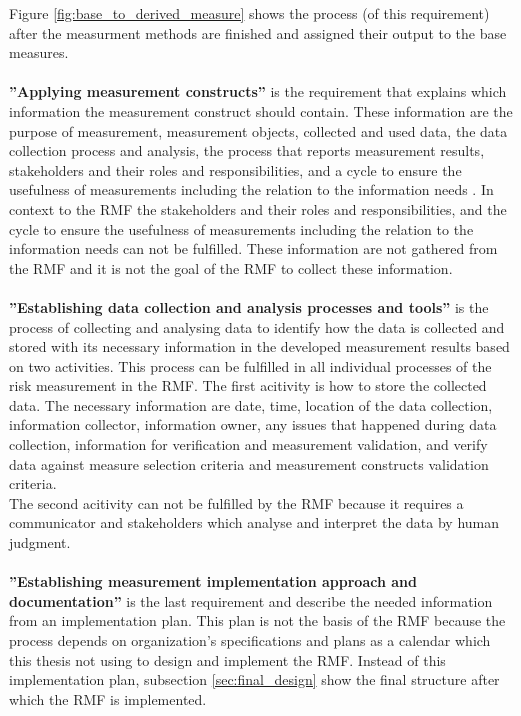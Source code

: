 Figure \ref{fig:base_to_derived_measure} shows the process (of this requirement) after the measurment methods are finished and assigned their output to the base measures.\\ \\

\textbf{''Applying measurement constructs''} is the requirement that explains which information the measurement construct should contain. These information are the purpose of measurement, measurement objects, collected and used data, the data collection process and analysis, the process that reports measurement results, stakeholders and their roles and responsibilities, and a cycle to ensure the usefulness of measurements including the relation to the information needs \cite{ISO_27004_2009}. In context to the RMF the stakeholders and their roles and responsibilities, and the cycle to ensure the usefulness of measurements including the relation to the information needs can not be fulfilled. These information are not gathered from the RMF and it is not the goal of the RMF to collect these information. \\ \\

\textbf{''Establishing data collection and analysis processes and tools''} is the process of collecting and analysing data to identify how the data is collected and stored with its necessary information in the developed measurement results based on two activities. This process can be fulfilled in all individual processes of the risk measurement in the RMF. The first acitivity is how to store the collected data. The necessary information are date, time, location of the data collection, information collector, information owner, any issues that happened during data collection, information for verification and measurement validation, and verify data against measure selection criteria and measurement constructs validation criteria. \\ The second acitivity can not be fulfilled by the RMF because it requires a communicator and stakeholders which analyse and interpret the data by human judgment. \\ \\

\textbf{''Establishing measurement implementation approach and documentation''} is the last requirement and describe the needed information from an implementation plan. This plan is not the basis of the RMF because the process depends on organization's specifications and plans as a calendar which this thesis not using to design and implement the RMF. Instead of this implementation plan, subsection \ref{sec:final_design} show the final structure after which the RMF is implemented. \\ \\

